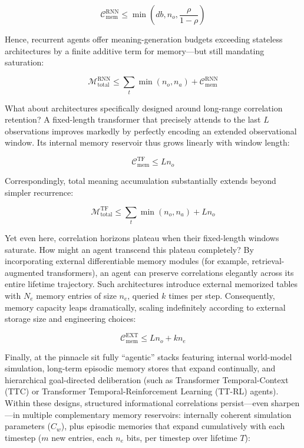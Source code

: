 \begin{equation*}
\mathcal{C}_{\text{mem}}^{\text{RNN}} \leq \min \left( d b, n_o, \frac{\rho}{1-\rho} \right)
\end{equation*}

Hence, recurrent agents offer meaning-generation budgets exceeding stateless architectures by a finite additive term for memory---but still mandating saturation:

\begin{equation*}
\mathcal{M}_{\text{total}}^{\text{RNN}} \leq \sum_t \min(n_o, n_a) + \mathcal{C}_{\text{mem}}^{\text{RNN}}
\end{equation*}

What about architectures specifically designed around long-range correlation retention? A fixed-length transformer that precisely attends to the last $L$ observations improves markedly by perfectly encoding an extended observational window. Its internal memory reservoir thus grows linearly with window length:

\begin{equation*}
\mathcal{C}_{\text{mem}}^{\text{TF}} \leq L n_o
\end{equation*}

Correspondingly, total meaning accumulation substantially extends beyond simpler recurrence:

\begin{equation*}
\mathcal{M}^{\text{TF}}_{\text{total}} \leq \sum_t \min(n_o,n_a) + L n_o
\end{equation*}

Yet even here, correlation horizons plateau when their fixed-length windows saturate. How might an agent transcend this plateau completely? By incorporating external differentiable memory modules (for example, retrieval-augmented transformers), an agent can preserve correlations elegantly across its entire lifetime trajectory. Such architectures introduce external memorized tables with $N_e$ memory entries of size $n_e$, queried $k$ times per step. Consequently, memory capacity leaps dramatically, scaling indefinitely according to external storage size and engineering choices:

\begin{equation*}
\mathcal{C}_{\text{mem}}^{\text{EXT}} \leq L n_o + k n_e
\end{equation*}

Finally, at the pinnacle sit fully ``agentic'' stacks featuring internal world-model simulation, long-term episodic memory stores that expand continually, and hierarchical goal-directed deliberation (such as Transformer Temporal-Context (TTC) or Transformer Temporal-Reinforcement Learning (TT-RL) agents). Within these designs, structured informational correlations persist---even sharpen---in multiple complementary memory reservoirs: internally coherent simulation parameters ($C_w$), plus episodic memories that expand cumulatively with each timestep ($m$ new entries, each $n_e$ bits, per timestep over lifetime $T$):

